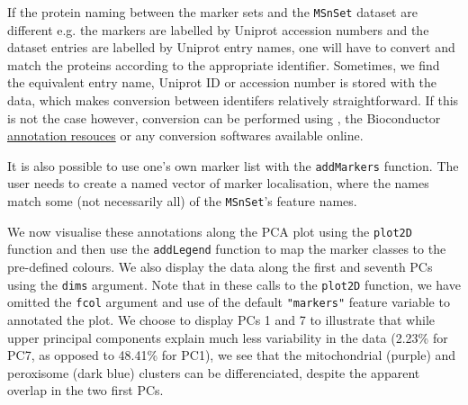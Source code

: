 If the protein naming between the marker sets and the \texttt{MSnSet}
dataset are different e.g. the markers are labelled by Uniprot
accession numbers and the dataset entries are labelled by Uniprot
entry names, one will have to convert and match the proteins according
to the appropriate identifier. Sometimes, we find the equivalent entry
name, Uniprot ID or accession number is stored with the data, which
makes conversion between identifers relatively straightforward. If
this is not the case however, conversion can be performed using
, the Bioconductor
\href{http://bioconductor.org/help/workflows/annotation/Annotation_Resources/}{annotation
  resouces} or any conversion softwares available online.

It is also possible to use one's own marker list with the
\texttt{addMarkers} function. The user needs to create a named vector
of marker localisation, where the names match some (not necessarily
all) of the \texttt{MSnSet}'s feature names.

We now visualise these annotations along the PCA plot using the
\texttt{plot2D} function and then use the \texttt{addLegend} function
to map the marker classes to the pre-defined colours. We also display
the data along the first and seventh PCs using the \texttt{dims}
argument. Note that in these calls to the \texttt{plot2D} function, we
have omitted the \texttt{fcol} argument and use of the default
\texttt{"markers"} feature variable to annotated the plot. We choose
to display PCs 1 and 7 to illustrate that while upper principal
components explain much less variability in the data (2.23\% for PC7,
as opposed to 48.41\% for PC1), we see that the mitochondrial (purple)
and peroxisome (dark blue) clusters can be differenciated, despite the
apparent overlap in the two first PCs.

